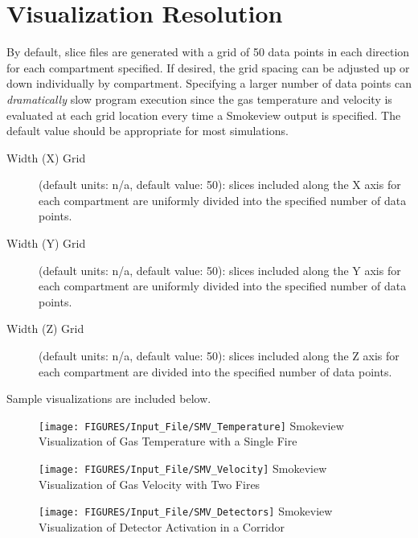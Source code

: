 \section{Visualization Resolution}

By default, slice files are generated with a grid of 50 data points in each direction for each compartment specified. If desired, the grid spacing can be adjusted up or down individually by compartment. Specifying a larger number of data points can \textit{dramatically} slow program execution since the gas temperature and velocity is evaluated at each grid location every time a Smokeview output is specified.  The default value should be appropriate for most simulations.

\begin{description}
\item[Width (X) Grid] (default units: n/a, default value: 50): slices included along the X axis for each compartment are uniformly divided into the specified number of data points.

\item[Width (Y) Grid] (default units: n/a, default value: 50): slices included along the Y axis for each compartment are uniformly divided into the specified number of data points.

\item[Width (Z) Grid] (default units: n/a, default value: 50): slices included along the Z axis for each compartment are divided into the specified number of data points.
\end{description}

Sample visualizations are included below.

\begin{figure}[h!]
\begin{center}
\texttt{[image: FIGURES/Input\_File/SMV\_Temperature]}
Smokeview Visualization of Gas Temperature with a Single Fire
\end{center}
\end{figure}

\begin{figure}[h!]
\begin{center}
\texttt{[image: FIGURES/Input\_File/SMV\_Velocity]}
Smokeview Visualization of Gas Velocity with Two Fires
\end{center}
\end{figure}

\begin{figure}[h!]
\begin{center}
\texttt{[image: FIGURES/Input\_File/SMV\_Detectors]}
Smokeview Visualization of Detector Activation in a Corridor
\end{center}
\end{figure}


